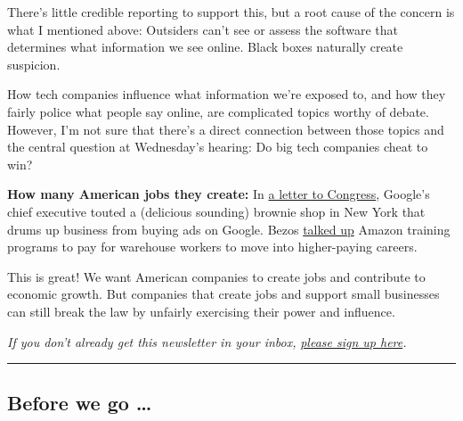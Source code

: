 There's little credible reporting to support this, but a root cause of
the concern is what I mentioned above: Outsiders can't see or assess the
software that determines what information we see online. Black boxes
naturally create suspicion.

How tech companies influence what information we're exposed to, and how
they fairly police what people say online, are complicated topics worthy
of debate. However, I'm not sure that there's a direct connection
between those topics and the central question at Wednesday's hearing: Do
big tech companies cheat to win?

\textbf{How many American jobs they create:} In
\href{https://docs.house.gov/meetings/JU/JU05/20200729/110883/HHRG-116-JU05-Wstate-PichaiS-20200729.pdf}{a
letter to Congress}, Google's chief executive touted a (delicious
sounding) brownie shop in New York that drums up business from buying
ads on Google. Bezos
\href{https://docs.house.gov/meetings/JU/JU05/20200729/110883/HHRG-116-JU05-Wstate-BezosJ-20200729.pdf}{talked
up} Amazon training programs to pay for warehouse workers to move into
higher-paying careers.

This is great! We want American companies to create jobs and contribute
to economic growth. But companies that create jobs and support small
businesses can still break the law by unfairly exercising their power
and influence.

\emph{If you don't already get this newsletter in your inbox,}
\href{https://www.nytimes3xbfgragh.onion/newsletters/signup/OT}{\emph{please
sign up here}}\emph{.}

\begin{center}\rule{0.5\linewidth}{\linethickness}\end{center}

\hypertarget{before-we-go-}{%
\subsection{Before we go \ldots{}}\label{before-we-go-}}

